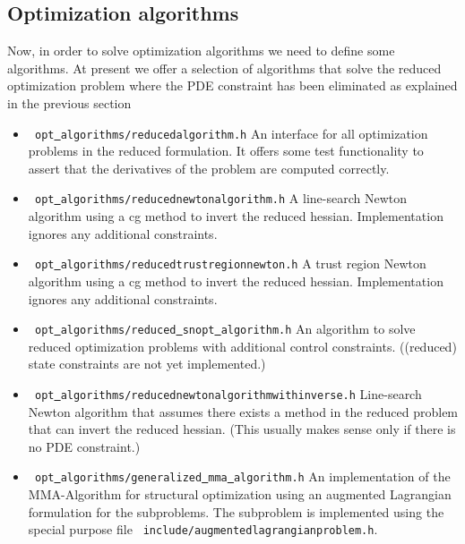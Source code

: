 \subsection{Optimization algorithms}
Now, in order to solve optimization algorithms we need to define some algorithms.
At present we offer a selection of algorithms that solve the reduced optimization 
problem where the PDE constraint has been eliminated as explained in the previous section
\begin{itemize}
\item \texttt{ opt\underline{ }algorithms/reducedalgorithm.h} An interface for all 
  optimization problems in the reduced formulation. It offers some test functionality
  to assert that the derivatives of the problem are computed correctly.
\item \texttt{ opt\underline{ }algorithms/reducednewtonalgorithm.h}
  A line-search Newton algorithm using a cg method to invert the reduced hessian. 
  Implementation ignores any additional constraints.
\item \texttt{ opt\underline{ }algorithms/reducedtrustregionnewton.h}
  A trust region Newton algorithm using a cg method to invert the reduced hessian.
  Implementation ignores any additional constraints.
\item \texttt{ opt\underline{ }algorithms/reduced\underline{ }snopt\underline{ }algorithm.h}
  An algorithm to solve reduced optimization problems with additional control constraints.
  ((reduced) state constraints are not yet implemented.)
\item \texttt{ opt\underline{ }algorithms/reducednewtonalgorithmwithinverse.h}
  Line-search Newton algorithm that assumes there exists a method in the reduced problem
  that can invert the reduced hessian. (This usually makes sense only if there is no 
  PDE constraint.)
\item \texttt{ opt\underline{ }algorithms/generalized\underline{ }mma\underline{ }algorithm.h}
  An implementation of the MMA-Algorithm for structural optimization using an augmented
  Lagrangian formulation for the subproblems. The subproblem is implemented using the 
  special purpose file
  \texttt{ include/augmentedlagrangianproblem.h}.
\end{itemize} 

